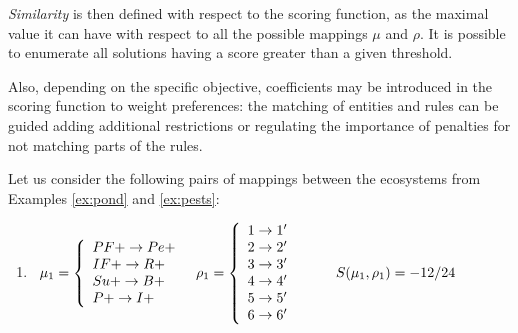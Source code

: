 \documentclass[a4paper,twoside]{article}
\begin{document}
\emph{Similarity} is then defined with respect to the scoring function, as the maximal value it can have with respect to all the possible mappings $\mu$ and $\rho$.
It is possible to enumerate all solutions having a score greater than a given threshold. 

Also, depending on the specific objective, coefficients may be introduced in the scoring  function to weight preferences:  the matching of entities and  rules can be guided adding additional  restrictions or regulating the importance of penalties for not matching parts of the rules.  


\begin{example}[Similarity] \label{ex:similarity}
Let us consider the following pairs of mappings between the ecosystems from Examples \ref{ex:pond} and \ref{ex:pests}:
\begin{enumerate}
\item $\begin{array}{l@{\hspace{3mm}}l@{\hspace{3mm}}l}
	\mapcomp_1=\left\{
				\begin{array}{l}
					PF+ \to Pe+ \\
                    IF+ \to R+ \\
                    Su+ \to B+\\
                    P+ \to I+\\
				\end{array}\right.
                    &
     \maprule_1=\left\{
                \begin{array}{l}
					1 \to 1' \\
                    2 \to 2' \\
					3 \to 3' \\
                    4 \to 4' \\
					5 \to 5' \\
                    6 \to 6' \\
					\end{array}\right. 
                    &
  \qquad \gf(\mapcomp_1,\maprule_1)=-12/24
     \end{array}$
              


\end{enumerate}
\end{example}
\end{document}
